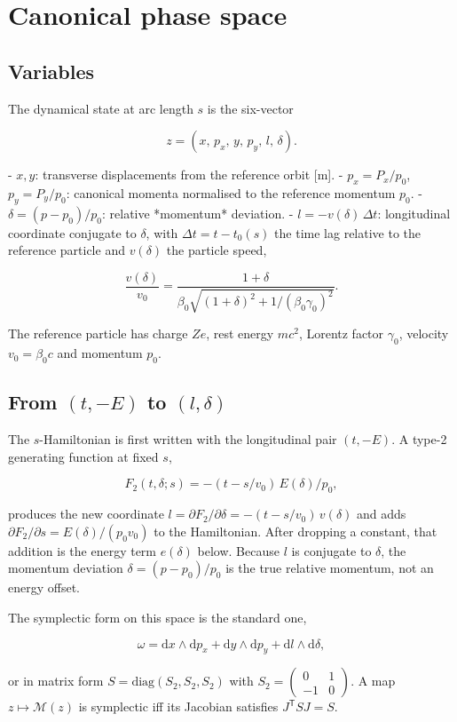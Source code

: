 \documentclass[11pt,a4paper]{article}
\begin{document}
\clearpage
\section{Canonical phase space}

\subsection{Variables}

The dynamical state at arc length $s$ is the six-vector

\[
z=(x,\,p_x,\,y,\,p_y,\,l,\,\delta).
\]

- $x,y$: transverse displacements from the reference orbit [m].
- $p_x=P_x/p_0$, $p_y=P_y/p_0$: canonical momenta normalised to the
  reference momentum $p_0$.
- $\delta=(p-p_0)/p_0$: relative *momentum* deviation.
- $l=-v(\delta)\,\Delta t$: longitudinal coordinate conjugate to $\delta$,
  with $\Delta t=t-t_0(s)$ the time lag relative to the reference particle
  and $v(\delta)$ the particle speed,

\[
\frac{v(\delta)}{v_0}=\frac{1+\delta}{\beta_0\sqrt{(1+\delta)^2+1/(\beta_0\gamma_0)^2}}.
\]

The reference particle has charge $Ze$, rest energy $mc^2$, Lorentz factor
$\gamma_0$, velocity $v_0=\beta_0 c$ and momentum $p_0$.

\subsection{From $(t,-E)$ to $(l,\delta)$}

The $s$-Hamiltonian is first written with the longitudinal pair
$(t,-E)$. A type-2 generating function at fixed $s$,

\[
F_2(t,\delta;s)=-(t-s/v_0)\,E(\delta)/p_0,
\]

produces the new coordinate $l=\partial F_2/\partial\delta=-(t-s/v_0)\,v(\delta)$
and adds $\partial F_2/\partial s=E(\delta)/(p_0 v_0)$ to the Hamiltonian.
After dropping a constant, that addition is the energy term $e(\delta)$
below. Because $l$ is conjugate to $\delta$, the momentum deviation
$\delta=(p-p_0)/p_0$ is the true relative momentum, not an energy offset.

The symplectic form on this space is the standard one,

\[
\omega=\mathrm{d}x\wedge\mathrm{d}p_x+\mathrm{d}y\wedge\mathrm{d}p_y+\mathrm{d}l\wedge\mathrm{d}\delta,
\]

or in matrix form $S=\mathrm{diag}(S_2,S_2,S_2)$ with
$S_2=\begin{pmatrix}0&1\\-1&0\end{pmatrix}$. A map $z\mapsto\mathcal{M}(z)$
is symplectic iff its Jacobian satisfies $J^\mathsf{T}SJ=S$.
\end{document}
